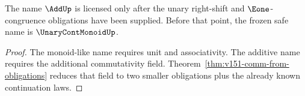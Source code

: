 \begin{corollary}
The name \(\AddUp\) is licensed only after the unary right-shift and \(\Eone\)-congruence obligations have been supplied. Before that point, the frozen safe name is \(\UnaryContMonoidUp\).
\end{corollary}

\begin{proof}
The monoid-like name requires unit and associativity. The additive name requires the additional commutativity field. Theorem~\ref{thm:v151-comm-from-obligations} reduces that field to two smaller obligations plus the already known continuation laws.
\end{proof}
